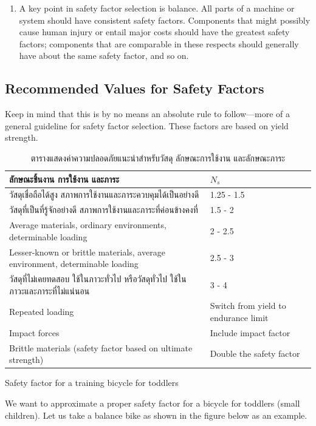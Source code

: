 \documentclass[a4paper,openany,12pt]{book}
\begin{document}
\begin{enumerate}
\item A key point in safety factor selection is balance. All parts of a
machine or system should have consistent safety factors. Components
that might possibly cause human injury or entail major costs should
have the greatest safety factors; components that are comparable in
these respects should generally have about the same safety factor,
and so on.
\end{enumerate}

\subsection{Recommended Values for Safety Factors}
\label{sec:orgd97861a}
Keep in mind that this is by no means an absolute rule to follow---more
of a general guideline for safety factor selection. These factors are
based on yield strength.

\begin{table}[htbp]
\caption{\label{tab:orge6877eb}
ตารางแสดงค่าความปลอดภัยแนะนำสำหรับวัสดุ ลักษณะการใช้งาน และลักษณะภาระ}
\centering
\begin{tabular}{ll}
\toprule
ลักษณะชิ้นงาน การใช้งาน และภาระ & \(N_s\)\\
\midrule
วัสดุเชื่อถือได้สูง สภาพการใช้งานและภาระควบคุมได้เป็นอย่างดี & 1.25 - 1.5\\
วัสดุที่เป็นที่รู้จักอย่างดี สภาพการใช้งานและภาระที่ค่อนข้างคงที่ & 1.5 - 2\\
Average materials, ordinary environments, determinable loading & 2 - 2.5\\
Lesser-known or brittle materials, average environment, determinable loading & 2.5 - 3\\
วัสดุที่ไม่เคยทดสอบ ใช้ในภาวะทั่วไป หรือวัสดุทั่วไป ใช้ในภาวะและภาระที่ไม่แน่นอน & 3 - 4\\
Repeated loading & Switch from yield to endurance limit\\
Impact forces & Include impact factor\\
Brittle materials (safety factor based on ultimate strength) & Double the safety factor\\
\bottomrule
\end{tabular}
\end{table}

Safety factor for a training bicycle for toddlers

We want to approximate a proper safety factor for a bicycle for toddlers
(small children). Let us take a balance bike as shown in the figure
below as an example.
\end{document}
